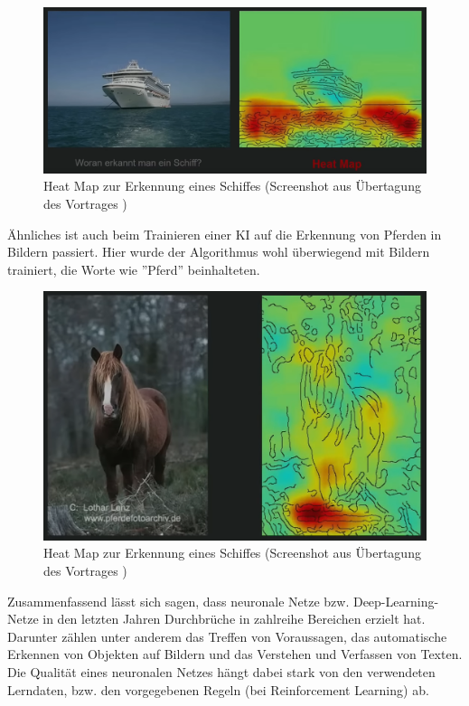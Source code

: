 \documentclass[a4paper,12pt, german]{report}
\begin{document}
\begin{figure}[H]
  \center
 \includegraphics[width=14cm]{images/Schiff-HeatMap.png}
  \caption[Heat Map zur Erkennung eines Schiffes]{Heat Map zur Erkennung eines Schiffes (Screenshot aus Übertagung des Vortrages \cite{16})}
\end{figure}

Ähnliches ist auch beim Trainieren einer KI auf die Erkennung von Pferden in Bildern passiert. Hier wurde der Algorithmus wohl überwiegend mit Bildern trainiert, die Worte wie ''Pferd'' beinhalteten.

\begin{figure}[H]
  \center
 \includegraphics[width=14cm]{images/Pferd-HeatMap.png}
  \caption[Heat Map zur Erkennung eines Schiffes]{Heat Map zur Erkennung eines Schiffes (Screenshot aus Übertagung des Vortrages \cite{16})}
\end{figure}

Zusammenfassend lässt sich sagen, dass neuronale Netze bzw. Deep-Learning-Netze in den letzten Jahren Durchbrüche in zahlreihe Bereichen erzielt hat. Darunter zählen unter anderem das Treffen von Voraussagen, das automatische Erkennen von Objekten auf Bildern und das Verstehen und Verfassen von Texten. Die Qualität eines neuronalen Netzes hängt dabei stark von den verwendeten Lerndaten, bzw. den vorgegebenen Regeln (bei Reinforcement Learning) ab. 
\end{document}
